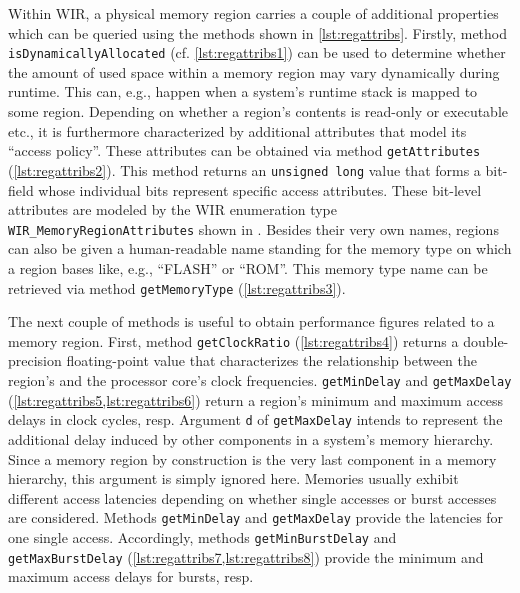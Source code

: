Within \gls{WIR}, a physical memory region carries a couple of additional properties which can be queried using the methods shown in \cref{lst:regattribs}.
Firstly, method \texttt{isDynamicallyAllocated} (cf. \cref{lst:regattribs1}) can be used to determine whether the amount of used space within a memory region may vary dynamically during runtime.
This can, e.g., happen when a system's runtime stack is mapped to some region.
Depending on whether a region's contents is read-only or executable etc., it is furthermore characterized by additional attributes that model its ``access policy''.
These attributes can be obtained via method \texttt{getAttributes} (\cref{lst:regattribs2}).
This method returns an \texttt{unsigned long} value that forms a bit-field whose individual bits represent specific access attributes.
These bit-level attributes are modeled by the \gls{WIR} enumeration type \texttt{WIR\_MemoryRegionAttributes} shown in .
Besides their very own names, regions can also be given a human-readable name standing for the memory type on which a region bases like, e.g., ``FLASH'' or ``ROM''.
This memory type name can be retrieved via method \texttt{getMemoryType} (\cref{lst:regattribs3}).

The next couple of methods is useful to obtain performance figures related to a memory region.
First, method \texttt{getClockRatio} (\cref{lst:regattribs4}) returns a double-precision floating-point value that characterizes the relationship between the region's and the processor core's clock frequencies.
\texttt{getMinDelay} and \texttt{getMaxDelay} (\cref{lst:regattribs5,lst:regattribs6}) return a region's minimum and maximum access delays in clock cycles, resp.
Argument \texttt{d} of \texttt{getMaxDelay} intends to represent the additional delay induced by other components in a system's memory hierarchy.
Since a memory region by construction is the very last component in a memory hierarchy, this argument is simply ignored here.
Memories usually exhibit different access latencies depending on whether single accesses or burst accesses are considered.
Methods \texttt{getMinDelay} and \texttt{getMaxDelay} provide the latencies for one single access.
Accordingly, methods \texttt{getMinBurstDelay} and \texttt{getMaxBurstDelay} (\cref{lst:regattribs7,lst:regattribs8}) provide the minimum and maximum access delays for bursts, resp.

